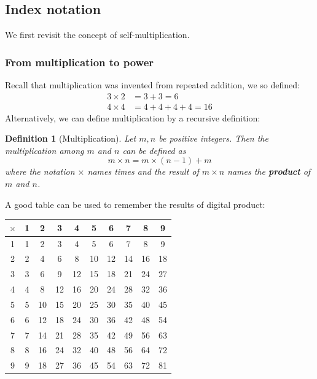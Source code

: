 \documentclass[12pt]{article}
\newtheorem{definition}{Definition}[section]
\begin{document}
    \subsection{Index notation}

    We first revisit the concept of self-multiplication.

    \subsubsection*{From multiplication to power}

    Recall that multiplication was invented from repeated addition, we so defined: \begin{align*}
        3\times 2&=3+3=6\\
        4\times 4&=4+4+4+4=16
    \end{align*}
    Alternatively, we can define multiplication by a recursive definition:

    \begin{definition}[Multiplication]
        Let $m,n$ be positive integers. Then the multiplication among $m$ and $n$ can be defined as $$m\times n= m\times (n-1) + m$$
        where the notation $\times$ names times and the result of $m\times n$ names the \textbf{product} of $m$ and $n$.
    \end{definition}

    A good table can be used to remember the results of digital product:

    \begin{center}
        \begin{tabular}{|c||c|c|c|c|c|c|c|c|c|}
            \hline
            $\times$&1&2&3&4&5&6&7&8&9\\
            \hline
            \hline
            1&1&2&3&4&5&6&7&8&9\\
            \hline
            2&2&4&6&8&10&12&14&16&18\\
            \hline
            3&3&6&9&12&15&18&21&24&27\\
            \hline
            4&4&8&12&16&20&24&28&32&36\\
            \hline
            5&5&10&15&20&25&30&35&40&45\\
            \hline
            6&6&12&18&24&30&36&42&48&54\\
            \hline
            7&7&14&21&28&35&42&49&56&63\\
            \hline
            8&8&16&24&32&40&48&56&64&72\\
            \hline
            9&9&18&27&36&45&54&63&72&81\\
            \hline
        \end{tabular}
    \end{center}
\end{document}
